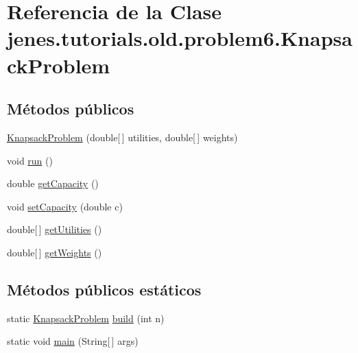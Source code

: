 \hypertarget{classjenes_1_1tutorials_1_1old_1_1problem6_1_1_knapsack_problem}{\section{Referencia de la Clase jenes.\-tutorials.\-old.\-problem6.\-Knapsack\-Problem}
\label{classjenes_1_1tutorials_1_1old_1_1problem6_1_1_knapsack_problem}
}
\subsection*{Métodos públicos}
\begin{DoxyCompactItemize}
\item 
\hyperlink{classjenes_1_1tutorials_1_1old_1_1problem6_1_1_knapsack_problem_a98ced3e27ae818b37a2a3eb0049d6e85}{Knapsack\-Problem} (double\mbox{[}$\,$\mbox{]} utilities, double\mbox{[}$\,$\mbox{]} weights)
\item 
void \hyperlink{classjenes_1_1tutorials_1_1old_1_1problem6_1_1_knapsack_problem_adbb69b885007d3726fc810356eac67c0}{run} ()
\item 
double \hyperlink{classjenes_1_1tutorials_1_1old_1_1problem6_1_1_knapsack_problem_abd6659702b32915c9b2a5a6666f1dc48}{get\-Capacity} ()
\item 
void \hyperlink{classjenes_1_1tutorials_1_1old_1_1problem6_1_1_knapsack_problem_aecba52f753029fdda23b07cf2242f924}{set\-Capacity} (double c)
\item 
double\mbox{[}$\,$\mbox{]} \hyperlink{classjenes_1_1tutorials_1_1old_1_1problem6_1_1_knapsack_problem_a128edb3ce375d4f9198e4c8373efb183}{get\-Utilities} ()
\item 
double\mbox{[}$\,$\mbox{]} \hyperlink{classjenes_1_1tutorials_1_1old_1_1problem6_1_1_knapsack_problem_ab14674173825d76b3fb45b0a7e4f664e}{get\-Weights} ()
\end{DoxyCompactItemize}
\subsection*{Métodos públicos estáticos}
\begin{DoxyCompactItemize}
\item 
static \hyperlink{classjenes_1_1tutorials_1_1old_1_1problem6_1_1_knapsack_problem}{Knapsack\-Problem} \hyperlink{classjenes_1_1tutorials_1_1old_1_1problem6_1_1_knapsack_problem_a8e9ae71984885743ff2892d4bff2727e}{build} (int n)
\item 
static void \hyperlink{classjenes_1_1tutorials_1_1old_1_1problem6_1_1_knapsack_problem_a135fb0906a4034fcd7be21c23f794953}{main} (String\mbox{[}$\,$\mbox{]} args)
\end{DoxyCompactItemize}


